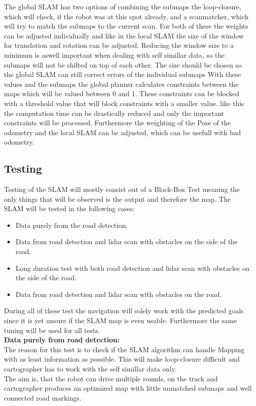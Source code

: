 The global SLAM has two options of combining the submaps the loop-closure, which will check, if the robot was at this spot already, and a scanmatcher, which will try to match the submaps to the current scan. For both of these the weights can be adjusted individually and like in the local SLAM the size of the window for translation and rotation can be adjusted. Reducing the window size to a minimum is aswell important when dealing with self simillar data, so the submaps will not be shifted on top of each other. The size should be chosen so the global SLAM can still correct errors of the individual submaps 
With these values and the submaps the global planner calculates constraints between the maps which will be valued between 0 and 1. These constraints can be blocked with a threshold value that will block constraints with a smaller value. like this the computation time can be drastically reduced and only the important constraints will be processed. Furthermore the weighting of the Pose of the odometry and the local SLAM can be adjusted, which can be usefull with bad odometry.

\subsection{Testing}
Testing of the SLAM will mostly consist out of a Black-Box Test meaning the only things that will be observed is the output and therefore the map.
The SLAM will be tested in the following cases:
\begin{itemize}
	\item Data purely from the road detection.
	\item Data from road detection and lidar scan with obstacles on the side of the road.
	\item Long duration test with both road detection and lidar scan with obstacles on the side of the road.
	\item Data from road detection and lidar scan with obstacles on the road.
\end{itemize}

During all of these test the navigation will solely work with the predicted goals since it is yet unsure if the SLAM map is even usable. Furthermore the same tuning will be used for all tests.\\

\textbf{Data purely from road detection:}\\
The reason for this test is to check if the SLAM algorithm can handle Mapping with as least information as possible. This will make loop-closure difficult and cartographer has to work with the self simillar data only.\\
The aim is, that the robot can drive multiple rounds, on the track and cartographer produces an optimized map with little unmatched submaps and well connected road markings.\\

